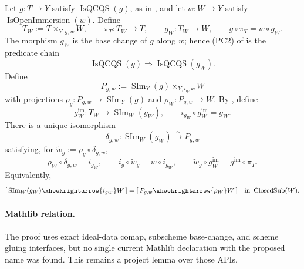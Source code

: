 \begin{lemma}
  \label{lemma:nagata-scheme-image-restrict-open}

  Let \(g\colon T\to Y\) satisfy \(\operatorname{IsQCQS}(g)\), as in
  , and let
  \(w\colon W\to Y\) satisfy \(\operatorname{IsOpenImmersion}(w)\).  Define
  \[
    T_W:=T\times_{Y,g,w}W,
    \qquad
    \pi_T\colon T_W\to T,
    \qquad
    g_W\colon T_W\to W,
    \qquad
    g\circ\pi_T=w\circ g_W.
  \]
  The morphism $g_W$ is the base change of $g$ along $w$; hence (PC2) of
   is the predicate chain
  \[
    \operatorname{IsQCQS}(g)
      \Longrightarrow\operatorname{IsQCQS}(g_W).                 \tag{SIRO0}
  \]
  Define
  \[
    P_{g,w}:=\operatorname{SIm}_Y(g)\times_{Y,i_g,w}W
  \]
  with projections
  $\rho_g\colon P_{g,w}\to\operatorname{SIm}_Y(g)$ and
  $\rho_W\colon P_{g,w}\to W$.  By
  , define
  \[
    g_W^{\mathrm{im}}\colon T_W\to\operatorname{SIm}_W(g_W),
    \qquad
    i_{g_W}\circ g_W^{\mathrm{im}}=g_W.                           \tag{SIRO1}
  \]
  There is a unique isomorphism
  \[
    \delta_{g,w}\colon\operatorname{SIm}_W(g_W)
      \xrightarrow{\ \sim\ }P_{g,w}
  \]
  satisfying, for
  $\widetilde w_g:=\rho_g\circ\delta_{g,w}$,
  \[
    \rho_W\circ\delta_{g,w}=i_{g_W},
    \qquad
    i_g\circ\widetilde w_g=w\circ i_{g_W},
    \qquad
    \widetilde w_g\circ g_W^{\mathrm{im}}
      =g^{\mathrm{im}}\circ\pi_T.
  \]
  Equivalently,
  \[
    [\,\operatorname{SIm}_W(g_W)
        \xhookrightarrow{i_{g_W}}W\,]
      =[\,P_{g,w}\xhookrightarrow{\rho_W}W\,]
      \quad\text{in }\operatorname{ClosedSub}(W).
  \]

  \paragraph{Mathlib relation.}
  The proof uses exact ideal-data comap, subscheme base-change, and scheme
  gluing interfaces, but no single current Mathlib declaration with the
  proposed \texttt{} name was
  found.  This remains a project lemma over those APIs.
\end{lemma}

